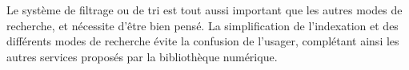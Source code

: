 Le système de filtrage ou de tri est tout aussi important que les autres modes de recherche, et nécessite d'être bien pensé. La simplification de l'indexation et des différents modes de recherche évite la confusion de l'usager, complétant ainsi les autres services proposés par la bibliothèque numérique. 